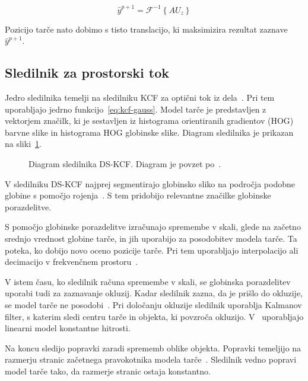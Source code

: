 \begin{equation}
\hat{y}^{p + 1} = \mathcal{F}^{-1}\left\{ A U_z \right\}
\label{eq:detection-score}
\end{equation}

Pozicijo tarče nato dobimo s tisto translacijo, ki maksimizira rezultat zaznave $\hat{y}^{p+1}$.












\subsection{Sledilnik za prostorski tok}
Jedro sledilnika temelji na sledilniku KCF za optični tok iz dela~\cite{henriques2015high}. Pri tem uporabljajo jedrno funkcijo~\eqref{eq:kcf-gauss}. Model tarče je predstavljen z vektorjem značilk, ki je sestavljen iz histograma orientiranih gradientov (HOG) barvne slike in histograma HOG globinske slike. Diagram sledilnika je prikazan na sliki~\ref{fig:diagram-dskcf}.

\begin{figure}[htb]
	\centering
	
	\caption[Diagram sledilnika DS-KCF]{Diagram sledilnika DS-KCF. Diagram je povzet po~\cite{hannuna2016ds}.}
	\label{fig:diagram-dskcf}
\end{figure}

V sledilniku DS-KCF najprej segmentirajo globinsko sliko na področja podobne globine s pomočjo rojenja~\cite{hannuna2016ds}. S tem pridobijo relevantne značilke globinske porazdelitve. 

S pomočjo globinske porazdelitve izračunajo spremembe v skali, glede na začetno srednjo vrednost globine tarče, in jih uporabijo za posodobitev modela tarče. Ta poteka, ko dobijo novo oceno pozicije tarče. Pri tem uporabljajo interpolacijo ali decimacijo v frekvenčnem prostoru~\cite{hannuna2016ds}.

V istem času, ko sledilnik računa spremembe v skali, se globinska porazdelitev uporabi tudi za zaznavanje okluzij. Kadar sledilnik zazna, da je prišlo do okluzije, se model tarče ne posodobi~\cite{hannuna2016ds}. Pri določanju okluzije sledilnik uporablja Kalmanov filter, s katerim sledi centru tarče in objekta, ki povzroča okluzijo. V~\cite{hannuna2016ds} uporabljajo linearni model konstantne hitrosti.  

Na koncu sledijo popravki zaradi sprememb oblike objekta. Popravki temeljijo na razmerju stranic začetnega pravokotnika modela tarče~\cite{hannuna2016ds}. Sledilnik vedno popravi model tarče tako, da razmerje stranic ostaja konstantno.





